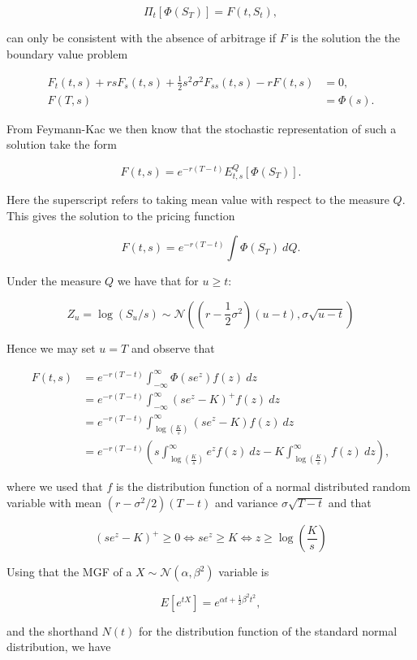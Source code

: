 \documentclass[
]{article}
\begin{document}
\[
\Pi_t[\Phi(S_T)]=F(t,S_t),
\]

can only be consistent with the absence of arbitrage if \(F\) is the
solution the the boundary value problem

\begin{align*}
F_t(t,s)+rsF_s(t,s)+\frac{1}{2}s^2\sigma^2F_{ss}(t,s)-rF(t,s)&=0,\\
F(T,s)&=\Phi(s).
\end{align*}

From Feymann-Kac we then know that the stochastic representation of such
a solution take the form

\[
F(t,s)=e^{-r(T-t)}E_{t,s}^Q[\Phi(S_T)].
\]

Here the superscript refers to taking mean value with respect to the
measure \(Q\). This gives the solution to the pricing function

\[
F(t,s)=e^{-r(T-t)}\int \Phi(S_T)\ dQ.
\]

Under the measure \(Q\) we have that for \(u\ge t\):

\[
Z_u=\log (S_u/s)\sim \mathcal{N}\left(\left(r-\frac{1}{2}\sigma^2\right)(u-t),\sigma\sqrt{u-t}\right)
\]

Hence we may set \(u=T\) and observe that

\begin{align*}
F(t,s)&=e^{-r(T-t)}\int_{-\infty}^\infty \Phi(se^z) f(z)\ dz\\
&=e^{-r(T-t)}\int_{-\infty}^\infty (se^z-K)^+ f(z)\ dz\\
&=e^{-r(T-t)}\int_{\log\left(\frac{K}{s}\right)}^{\infty} (se^z-K) f(z)\ dz\\
&=e^{-r(T-t)}\left(s\int_{\log\left(\frac{K}{s}\right)}^{\infty} e^z f(z)\ dz-K\int_{\log\left(\frac{K}{s}\right)}^{\infty} f(z)\ dz\right),
\end{align*}

where we used that \(f\) is the distribution function of a normal
distributed random variable with mean \((r-\sigma^2/2)(T-t)\) and
variance \(\sigma\sqrt{T-t}\) and that

\[
(se^z-K)^+ \ge 0\iff se^z\ge K\iff z\ge \log\left(\frac{K}{s}\right)
\]

Using that the MGF of a \(X\sim\mathcal{N}(\alpha, \beta^2)\) variable
is

\[
E[e^{tX}]=e^{\alpha t+\frac{1}{2}\beta ^2t^2},
\]

and the shorthand \(N(t)\) for the distribution function of the standard
normal distribution, we have
\end{document}
